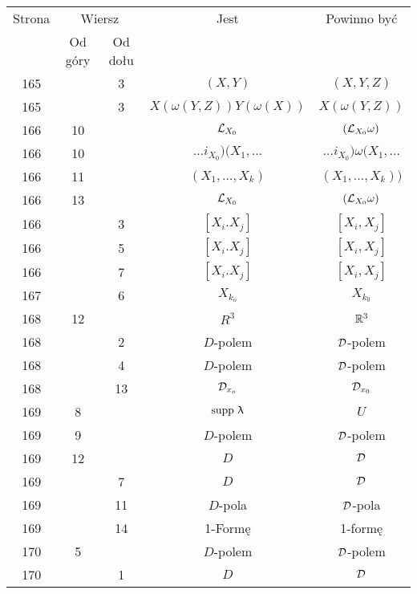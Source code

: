 \documentclass[a4paper,11pt]{article}
\begin{document}
\begin{center}
  \begin{tabular}{|c|c|c|c|c|}
    \hline
    Strona & \multicolumn{2}{c|}{Wiersz} & Jest
                              & Powinno być \\ \cline{2-3}
    & Od góry & Od dołu & & \\
    \hline
    165 & & \hphantom{0}3 & $( X, Y )$ & $( X, Y, Z )$ \\
    165 & & \hphantom{0}3 & $X( \omega( Y, Z ) ) Y( \omega( X ) )$
           & $X( \omega( Y, Z ) )$ \\
    166 & 10 & & $\mathcal{L}_{ { X_{ 0 } } }$ & $( \mathcal{L}_{ { X_{ 0 } } } \omega )$ \\
    166 & 10 & & $\ldots i_{ { X_{ 0 } } } ) ( X_{ 1 }, \ldots$
           & $\ldots i_{ { X_{ 0 } } } ) \omega( X_{ 1 }, \ldots$ \\
    166 & 11 & & $( X_{ 1 }, \ldots, X_{ k } )$
           & $( X_{ 1 }, \ldots, X_{ k } ))$ \\
    166 & 13 & & $\mathcal{L}_{ { X_{ 0 } } }$
    & $( \mathcal{L}_{ { X_{ 0 } } } \omega )$ \\
    166 & & \hphantom{0}3 & $[ X_{ i }. X_{ j } ]$ & $[ X_{ i }, X_{ j } ]$ \\
    166 & & \hphantom{0}5 & $[ X_{ i }. X_{ j } ]$ & $[ X_{ i }, X_{ j } ]$ \\
    166 & & \hphantom{0}7 & $[ X_{ i }. X_{ j } ]$ & $[ X_{ i }, X_{ j } ]$ \\
    167 & & \hphantom{0}6 & $X_{ k_{ o } }$ & $X_{ k_{ 0 } }$ \\
    168 & 12 & & $R^{ 3 }$ & $\mathbb{R}^{ 3 }$ \\
    168 & & \hphantom{0}2 & $D$-polem & $\mathcal{D}$-polem \\
    168 & & \hphantom{0}4 & $D$-polem & $\mathcal{D}$-polem \\
    168 & & 13 & $\mathcal{D}_{ x_{ o } }$ & $\mathcal{D}_{ x_{ 0 } }$ \\
    169 & \hphantom{0}8 & & $\mathrm{supp}\,\, \uplambda$ & $U$ \\
    169 & \hphantom{0}9 & & $D$-polem & $\mathcal{D}$-polem \\
    169 & 12 & & $D$ & $\mathcal{D}$ \\
    169 & & \hphantom{0}7 & $D$ & $\mathcal{D}$ \\
    169 & & 11 & $D$-pola & $\mathcal{D}$-pola \\
    169 & & 14 & 1-Formę & 1-formę \\
    170 & \hphantom{0}5 & & $D$-polem & $\mathcal{D}$-polem  \\
    170 & & \hphantom{0}1 & $D$ & $\mathcal{D}$ \\

\end{tabular}
\end{center}
\end{document}
